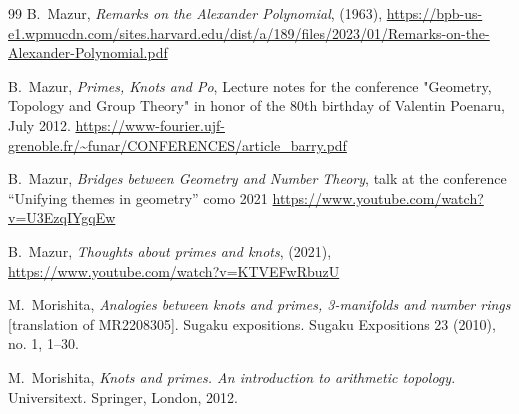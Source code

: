 \documentclass[12pt,english,reqno]{smfart}
\theoremstyle{plain}
\begin{document}
\begin{thebibliography}{99}
  B.~Mazur, {\em Remarks on the Alexander Polynomial}, (1963), \url{https://bpb-us-e1.wpmucdn.com/sites.harvard.edu/dist/a/189/files/2023/01/Remarks-on-the-Alexander-Polynomial.pdf}

  B.~Mazur, {\em Primes, Knots and Po}, Lecture notes for the conference "Geometry, Topology and Group Theory" in honor of the 80th birthday of Valentin Poenaru, July 2012. \url{https://www-fourier.ujf-grenoble.fr/~funar/CONFERENCES/article_barry.pdf}

  B.~Mazur, {\em Bridges between Geometry and Number Theory},  talk at the conference ``Unifying themes in geometry'' como 2021 \url{https://www.youtube.com/watch?v=U3EzqIYgqEw}

  B.~Mazur, {\em Thoughts about primes and knots},  (2021),  \url{https://www.youtube.com/watch?v=KTVEFwRbuzU}

 M.~Morishita, {\em Analogies between knots and primes, 3-manifolds and number rings} [translation of MR2208305]. Sugaku expositions. Sugaku Expositions 23 (2010), no. 1, 1--30.

 M.~Morishita, {\em Knots and primes. An introduction to arithmetic topology}. Universitext. Springer, London, 2012.






\end{thebibliography}
\end{document}
